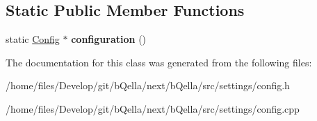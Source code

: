 \subsection*{Static Public Member Functions}
\begin{DoxyCompactItemize}
\item 
\hypertarget{classConfig_ac7077976241b21ad495ea9e4c8c120ab}{
static \hyperlink{classConfig}{Config} $\ast$ {\bfseries configuration} ()}
\label{classConfig_ac7077976241b21ad495ea9e4c8c120ab}

\end{DoxyCompactItemize}


The documentation for this class was generated from the following files:\begin{DoxyCompactItemize}
\item 
/home/files/Develop/git/bQella/next/bQella/src/settings/config.h\item 
/home/files/Develop/git/bQella/next/bQella/src/settings/config.cpp\end{DoxyCompactItemize}
